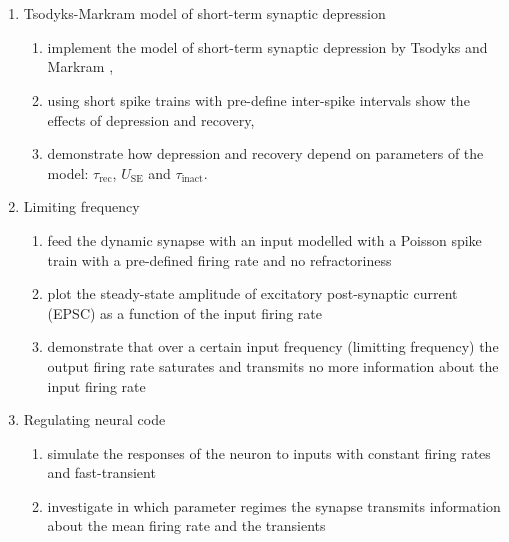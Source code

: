 \documentclass[12pt]{article}
\begin{document}
\section{}
\begin{enumerate}
    \item Tsodyks-Markram model of short-term synaptic depression        

        \begin{enumerate}
            \item implement the model of short-term synaptic
                depression by Tsodyks and Markram \cite{},
            \item using short spike trains with pre-define inter-spike
                intervals show the effects of depression and recovery,
            \item demonstrate how depression and recovery depend on
                parameters of the model: $\tau_{\mathrm{rec}}$,
                $U_{\mathrm{SE}}$ and $\tau_{\mathrm{inact}}$.
        \end{enumerate}

    \item Limiting frequency

        \begin{enumerate}
            \item feed the dynamic synapse with an input modelled with
                a Poisson spike train with a pre-defined firing rate
                and no refractoriness
            \item plot the steady-state amplitude of excitatory post-synaptic
                current  (EPSC) as a function of the input firing rate
            \item demonstrate that over a certain input frequency
                (limitting frequency) the output firing rate saturates
                and transmits no more information about the input firing
                rate
        \end{enumerate}

    \item Regulating neural code

        \begin{enumerate}
            \item simulate the responses of the neuron to inputs with
            constant firing rates and fast-transient
        \item investigate in which parameter regimes the synapse
            transmits information about the mean firing rate and  the
            transients
        \end{enumerate}


\end{enumerate}
\end{document}

